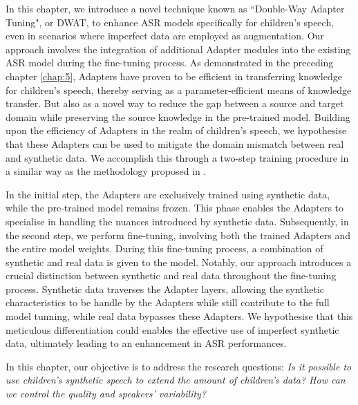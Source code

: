 In this chapter, we introduce a novel technique known as ``Double-Way Adapter Tuning", or DWAT, to enhance ASR models specifically for children's speech, even in scenarios where imperfect data are employed as augmentation. Our approach involves the integration of additional Adapter modules into the existing ASR model during the fine-tuning process. As demonstrated in the preceding chapter \ref{chap:5}, Adapters have proven to be efficient in transferring knowledge for children's speech, thereby serving as a parameter-efficient means of knowledge transfer. But also as a novel way to reduce the gap between a source and target domain while preserving the source knowledge in the pre-trained model.
Building upon the efficiency of Adapters in the realm of children's speech, we hypothesise that these Adapters can be used to mitigate the domain mismatch between real and synthetic data. We accomplish this through a two-step training procedure in a similar way as the methodology proposed in \cite{fan2022draft}.

In the initial step, the Adapters are exclusively trained using synthetic data, while the pre-trained model remains frozen. This phase enables the Adapters to specialise in handling the nuances introduced by synthetic data. Subsequently, in the second step, we perform fine-tuning, involving both the trained Adapters and the entire model weights. During this fine-tuning process, a combination of synthetic and real data is given to the model. Notably, our approach introduces a crucial distinction between synthetic and real data throughout the fine-tuning process. Synthetic data traverses the Adapter layers, allowing the synthetic characteristics to be handle by the Adapters while  still contribute to the full model tunning, while real data bypasses these Adapters. We hypothesise that this meticulous differentiation could enables the effective use of imperfect synthetic data, ultimately leading to an enhancement in ASR performances.

In this chapter, our objective is to address the research questions: \textit{Is it possible to use children's synthetic speech to extend the amount of children's data? How can we control the quality and speakers’ variability?}



